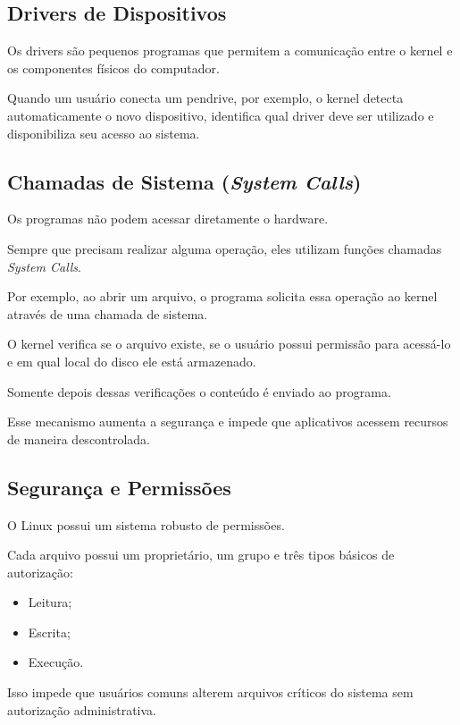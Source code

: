 \documentclass{article}
\begin{document}
\subsection{Drivers de Dispositivos}

Os drivers são pequenos programas que permitem a comunicação entre o kernel e os componentes físicos do computador.

Quando um usuário conecta um pendrive, por exemplo, o kernel detecta automaticamente o novo dispositivo, identifica qual driver deve ser utilizado e disponibiliza seu acesso ao sistema.

\subsection{Chamadas de Sistema (\textit{System Calls})}

Os programas não podem acessar diretamente o hardware.

Sempre que precisam realizar alguma operação, eles utilizam funções chamadas \textit{System Calls}.

Por exemplo, ao abrir um arquivo, o programa solicita essa operação ao kernel através de uma chamada de sistema.

O kernel verifica se o arquivo existe, se o usuário possui permissão para acessá-lo e em qual local do disco ele está armazenado.

Somente depois dessas verificações o conteúdo é enviado ao programa.

Esse mecanismo aumenta a segurança e impede que aplicativos acessem recursos de maneira descontrolada.

\subsection{Segurança e Permissões}

O Linux possui um sistema robusto de permissões.

Cada arquivo possui um proprietário, um grupo e três tipos básicos de autorização:

\begin{itemize}
\item Leitura;
\item Escrita;
\item Execução.
\end{itemize}

Isso impede que usuários comuns alterem arquivos críticos do sistema sem autorização administrativa.
\end{document}
